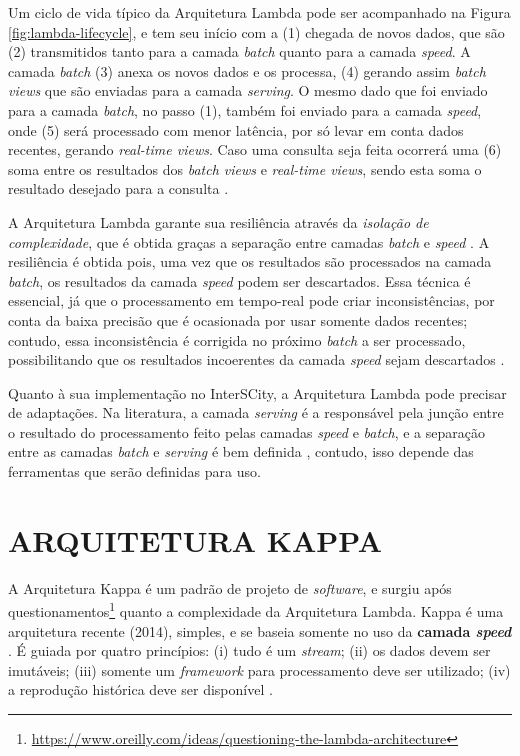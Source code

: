 Um ciclo de vida típico da Arquitetura Lambda pode ser acompanhado na Figura
\ref{fig:lambda-lifecycle}, e tem seu início com a (1) chegada
de novos dados, que são (2) transmitidos tanto para a camada
\textit{batch} quanto para a camada \textit{speed}. A camada \textit{batch}
(3) anexa os novos dados e os processa, (4) gerando assim
\textit{batch views} que são enviadas para a camada \textit{serving}. O mesmo
dado que foi enviado para a camada \textit{batch}, no passo (1), também foi
enviado para a camada \textit{speed}, onde (5) será processado com menor latência,
por só levar em conta dados recentes, gerando \textit{real-time views}. 
Caso uma consulta seja feita ocorrerá uma (6) soma entre os resultados
dos \textit{batch views} e \textit{real-time views}, sendo esta soma o resultado
desejado para a consulta \cite{marz2015}.

A Arquitetura Lambda garante sua resiliência através da \textit{isolação de
complexidade}, que é obtida graças a separação entre camadas \textit{batch}
e \textit{speed} \cite{marz2015}. A resiliência é obtida pois, uma vez que os
resultados são processados na camada \textit{batch}, os resultados da camada
\textit{speed} podem ser descartados. Essa técnica é essencial, já que o
processamento em tempo-real pode criar inconsistências, por conta da baixa
precisão que é ocasionada por usar somente dados recentes; contudo, essa
inconsistência é corrigida no próximo \textit{batch} a ser processado,
possibilitando que os resultados incoerentes da camada \textit{speed} sejam
descartados \cite{marz2015}.

Quanto à sua implementação no InterSCity, a Arquitetura Lambda pode precisar de
adaptações. Na literatura, a camada \textit{serving} é a responsável pela
junção entre o resultado do processamento feito pelas camadas \textit{speed} e
\textit{batch}, e a separação entre as camadas \textit{batch} e \textit{serving}
é bem definida \cite{marz2015}, contudo, isso depende das ferramentas que
serão definidas para uso. 

\section{ARQUITETURA KAPPA}

A Arquitetura Kappa é um padrão de projeto de \textit{software}, e surgiu após
questionamentos\footnote{\url{https://www.oreilly.com/ideas/questioning-the-lambda-architecture}}
quanto a complexidade da Arquitetura Lambda. Kappa é uma arquitetura recente (2014),
simples, e se baseia somente no uso da \textbf{camada \textit{speed}}
\cite{seyvet2016}. É guiada por quatro princípios:
(i) tudo é um \textit{stream}; (ii) os dados devem ser imutáveis; (iii)
somente um \textit{framework} para processamento deve ser utilizado; (iv) a
reprodução histórica deve ser disponível \cite{seyvet2016}.

